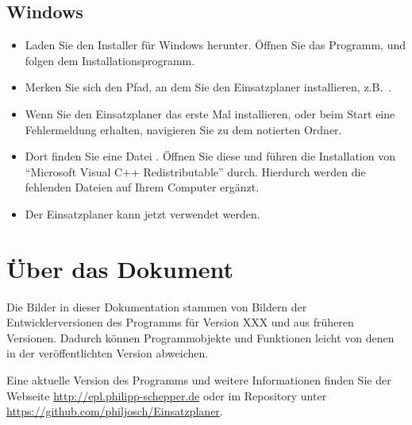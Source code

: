 \subsection{Windows}
\begin{itemize}
  \item Laden Sie den Installer für Windows herunter.
  Öffnen Sie das Programm, und folgen dem Installationsprogramm.
  \item Merken Sie sich den Pfad, an dem Sie den Einsatzplaner installieren, z.B.\ .
  \item Wenn Sie den Einsatzplaner das erste Mal installieren,
  oder beim Start eine Fehlermeldung erhalten, navigieren Sie zu dem notierten Ordner.
  \item Dort finden Sie eine Datei .
  Öffnen Sie diese und führen die Installation von "`Microsoft Visual C++ Redistributable"' durch.
  Hierdurch werden die fehlenden Dateien auf Ihrem Computer ergänzt.
  \item Der Einsatzplaner kann jetzt verwendet werden.
\end{itemize}



\section{Über das Dokument}\label{epl:alg:sonstiges}
Die Bilder in dieser Dokumentation stammen von Bildern der Entwicklerversionen des Programms für Version
XXX
und aus früheren Versionen.
Dadurch können Programmobjekte und Funktionen leicht von denen in der veröffentlichten Version abweichen.

Eine aktuelle Version des Programms und weitere Informationen finden Sie der Webseite \url{http://epl.philipp-schepper.de}
oder im Repository unter \url{https://github.com/philjosch/Einsatzplaner}.
